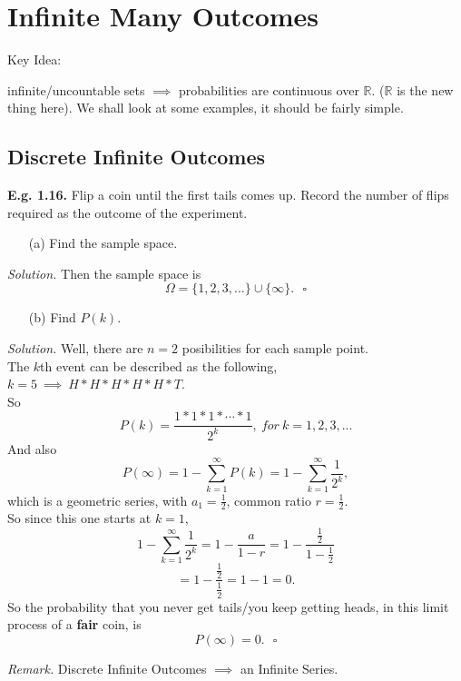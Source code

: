 \documentclass[12pt]{book}
\begin{document}
\section{Infinite Many Outcomes}
\hypertarget{infinitely many outcomes}{Key Idea: } infinite/uncountable sets $\implies{}$ probabilities are continuous over $\mathbb{R}$. ($\mathbb{R}$ is the new thing here). We shall look at some examples, it should be fairly simple.\\

\subsection{Discrete Infinite Outcomes}
\noindent \textbf{E.g. 1.16. } Flip a coin until the first tails comes up. Record the number of flips required as the outcome of the experiment.\\
\begin{itemize} \item[(a)] Find the sample space.\end{itemize}
\textit{Solution. }
Then the sample space is  $$\Omega = \{1,2,3,...\}\cup \{\infty\}.~~~\square$$
\begin{itemize} \item[(b)] Find $P(k)$.\end{itemize}
\textit{Solution. }
Well, there are $n=2$ posibilities for each sample point.\\
The $k$th event can be described as the following,\\
$k=5 ~\implies~H*H*H*H*H*T.$\\
So $$P(k) = \frac{1*1*1*\cdots *1}{2^k}, ~for~k=1,2,3,...$$
And also 
$$P(\infty) = 1- \sum\limits_{k=1}^{\infty} P(k)= 1- \sum\limits_{k=1}^{\infty} \frac{1}{2^k},$$
which is a geometric series, with $a_1 = \frac{1}{2}$, common ratio $r=\frac{1}{2}$.\\
So since this one starts at $k=1$, 
$$1- \sum\limits_{k=1}^{\infty} \frac{1}{2^k} = 1-\frac{a}{1-r} = 1-\frac{\frac{1}{2}}{1-\frac{1}{2}}$$
$$=1-\frac{\frac{1}{2}}{\frac{1}{2}}=1-1 = 0.$$
So the probability that you never get tails/you keep getting heads, in this limit process of a \textbf{fair} coin, is 
$$P(\infty) = 0.~~~\square$$

\noindent \textit{Remark. } Discrete Infinite Outcomes $\implies{}$ an Infinite Series.
\end{document}
